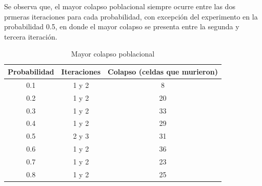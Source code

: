 \documentclass{article}
\begin{document}
Se observa que, el mayor colapso poblacional siempre ocurre entre las dos prmeras iteraciones para cada probabilidad, con excepción del experimento en la probabilidad 0.5, en donde el mayor colapso se presenta entre la segunda y tercera iteración.

\begin{table}[h]
\begin{center}
\caption{Mayor colapso poblacional}
\label{tabla}
\begin{tabular}{c c c}
\hline
\textbf{Probabilidad}&\textbf{Iteraciones}&\textbf{Colapso (celdas que murieron)}\\
\hline
0.1&1 y 2&8\\
0.2&1 y 2&20\\
0.3&1 y 2&33\\
0.4&1 y 2&29\\
0.5&2 y 3&31\\
0.6&1 y 2&36\\
0.7&1 y 2&23\\
0.8&1 y 2&25\\
\hline
\end{tabular}
\end{center}
\end{table}
\end{document}
